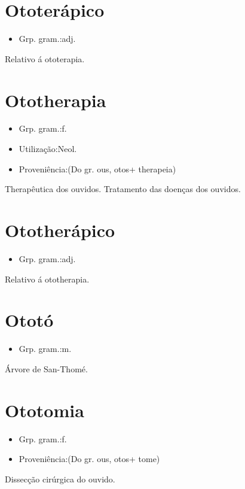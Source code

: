 \section{Ototerápico}
\begin{itemize}
\item {Grp. gram.:adj.}
\end{itemize}
Relativo á ototerapia.
\section{Ototherapia}
\begin{itemize}
\item {Grp. gram.:f.}
\end{itemize}
\begin{itemize}
\item {Utilização:Neol.}
\end{itemize}
\begin{itemize}
\item {Proveniência:(Do gr. \textunderscore ous\textunderscore , \textunderscore otos\textunderscore  + \textunderscore therapeia\textunderscore )}
\end{itemize}
Therapêutica dos ouvidos.
Tratamento das doenças dos ouvidos.
\section{Ototherápico}
\begin{itemize}
\item {Grp. gram.:adj.}
\end{itemize}
Relativo á ototherapia.
\section{Ototó}
\begin{itemize}
\item {Grp. gram.:m.}
\end{itemize}
Árvore de San-Thomé.
\section{Ototomia}
\begin{itemize}
\item {Grp. gram.:f.}
\end{itemize}
\begin{itemize}
\item {Proveniência:(Do gr. \textunderscore ous\textunderscore , \textunderscore otos\textunderscore  + \textunderscore tome\textunderscore )}
\end{itemize}
Dissecção cirúrgica do ouvido.

